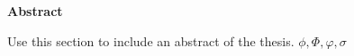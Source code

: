 \begin{center}
    {\Large\bfseries\sffamily Abstract}
\end{center}

Use this section to include an abstract of the thesis. \(\phi, \Phi, \varphi, \sigma\)

\newpage